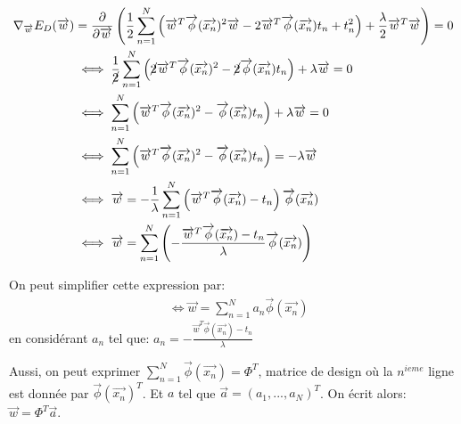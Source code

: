 \begin{equation}
    \begin{split}
    	\nabla_{\overrightarrow{w}} E_D(\overrightarrow{w}) &= \frac{\partial}{\partial \overrightarrow{w}} \left(\frac{1}{2} \sum_{n=1}^N \left(\overrightarrow{w}^T \overrightarrow{\phi}(\overrightarrow{x_n})^2 \overrightarrow{w} - 2 \overrightarrow{w}^T \overrightarrow{\phi}(\overrightarrow{x_n}) t_n + t_n^2\right) + \frac{\lambda}{2} \overrightarrow{w}^T \overrightarrow{w}\right) = 0 \\
    	&\iff \frac{1}{\cancel{2}} \sum_{n=1}^N \left( \cancel{2} \overrightarrow{w}^T \overrightarrow{\phi}(\overrightarrow{x_n})^2 - \cancel{2} \overrightarrow{\phi}(\overrightarrow{x_n}) t_n \right) + \lambda \overrightarrow{w} = 0 \\
    	&\iff \sum_{n=1}^N \left( \overrightarrow{w}^T \overrightarrow{\phi}(\overrightarrow{x_n})^2 - \overrightarrow{\phi}(\overrightarrow{x_n}) t_n \right) + \lambda \overrightarrow{w} = 0 \\
    	&\iff \sum_{n=1}^N \left( \overrightarrow{w}^T \overrightarrow{\phi}(\overrightarrow{x_n})^2 - \overrightarrow{\phi}(\overrightarrow{x_n}) t_n \right) = - \lambda \overrightarrow{w} \\
    	&\iff \overrightarrow{w} = - \frac{1}{\lambda}\sum_{n=1}^N \left( \overrightarrow{w}^T \overrightarrow{\phi}(\overrightarrow{x_n}) -  t_n \right)\overrightarrow{\phi}(\overrightarrow{x_n}) \\
    	&\iff \overrightarrow{w} = \sum_{n=1}^N \left( - \frac{\overrightarrow{w}^T \overrightarrow{\phi}(\overrightarrow{x_n}) -  t_n }{\lambda}\overrightarrow{\phi}(\overrightarrow{x_n})\right)
    \end{split}
\end{equation}

On peut simplifier cette expression par:
\begin{equation}
\begin{split}
	&\iff \overrightarrow{w} = \sum_{n=1}^N a_n \overrightarrow{\phi}(\overrightarrow{x_n})
\end{split}
\end{equation}
en considérant $a_n$ tel que: $ a_n = - \frac{\overrightarrow{w}^T \overrightarrow{\phi}(\overrightarrow{x_n}) -  t_n }{\lambda}$ 

Aussi, on peut exprimer $ \sum_{n=1}^N \overrightarrow{\phi}(\overrightarrow{x_n}) = \Phi^T $, matrice de design où la $ n^{ieme}$ ligne est donnée par $\overrightarrow{\phi}(\overrightarrow{x_n})^T $. Et $a$ tel que $ \overrightarrow{a} = (a_1, ..., a_N)^T$.
On écrit alors: $\overrightarrow{w} = \Phi^T \overrightarrow{a}$.

